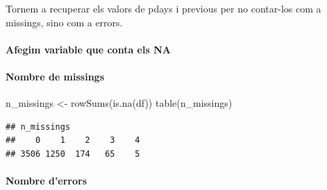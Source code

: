 \documentclass[
]{article}
\newenvironment{Shaded}{\begin{snugshade}}{\end{snugshade}}
\newcommand{\ControlFlowTok}[1]{\textcolor[rgb]{0.13,0.29,0.53}{\textbf{#1}}}
\newcommand{\DecValTok}[1]{\textcolor[rgb]{0.00,0.00,0.81}{#1}}
\newcommand{\FunctionTok}[1]{\textcolor[rgb]{0.00,0.00,0.00}{#1}}
\newcommand{\NormalTok}[1]{#1}
\newcommand{\OtherTok}[1]{\textcolor[rgb]{0.56,0.35,0.01}{#1}}
\newcommand{\SpecialCharTok}[1]{\textcolor[rgb]{0.00,0.00,0.00}{#1}}
\newcommand{\StringTok}[1]{\textcolor[rgb]{0.31,0.60,0.02}{#1}}
\begin{document}
Tornem a recuperar els valors de pdays i previous per no contar-los com
a missings, sino com a errors.

\begin{Shaded}
\end{Shaded}

\hypertarget{afegim-variable-que-conta-els-na}{%
\paragraph{Afegim variable que conta els
NA}\label{afegim-variable-que-conta-els-na}}

\begin{Shaded}
\end{Shaded}

\hypertarget{nombre-de-missings-1}{%
\paragraph{Nombre de missings}\label{nombre-de-missings-1}}

\begin{Shaded}
\begin{Highlighting}[]
\NormalTok{n\_missings }\OtherTok{\textless{}{-}} \FunctionTok{rowSums}\NormalTok{(}\FunctionTok{is.na}\NormalTok{(df))}
\FunctionTok{table}\NormalTok{(n\_missings)}
\end{Highlighting}
\end{Shaded}

\begin{verbatim}
## n_missings
##    0    1    2    3    4 
## 3506 1250  174   65    5
\end{verbatim}

\hypertarget{nombre-derrors-1}{%
\paragraph{Nombre d'errors}\label{nombre-derrors-1}}
\end{document}

